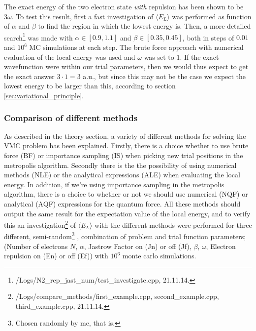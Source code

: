 The exact energy of the two electron state \textit{with} repulsion has been shown \cite{Taut} to be $3 \omega$. 
To test this result, first a fast investigation of $\langle E_L\rangle$ was performed as function of $\alpha$ and $\beta$ to find the region in which the lowest energy is. 
Then, a more detailed search\footnote{/Logs/N2\_rep\_jast\_num/test\_investigate.cpp, 21.11.14.} was made with $\alpha \in [0.9,1.1]$ and $\beta \in [0.35,0.45]$, both in steps of $0.01$ and $10^6$ MC simulations at each step. 
The brute force approach with numerical evaluation of the local energy was used and $\omega$ was set to $1$.
If the exact wavefunction were within our trial parameters, then we would thus expect to get the exact answer $3 \cdot 1 = 3$ a.u., but since this may not be the case we expect the lowest energy to be larger than this, according to section \ref{sec:variational_principle}.

\subsubsection{Comparison of different methods} \label{sec:exp_methods_E}

As described in the theory section, a variety of different methods for solving the VMC problem has been explained. 
Firstly, there is a choice whether to use brute force (BF) or importance sampling (IS) when picking new trial positions in the metropolis algorithm.
Secondly there is the the possibility of using numerical methods (NLE) or the analytical expressions (ALE) when evaluating the local energy. 
In addition, if we're using importance sampling in the metropolis algorithm, there is a choice to whether or not we should 
use numerical (NQF) or analytical (AQF) expressions for the quantum force. 
All these methods should output the same result for the expectation value of the local energy, and to verify this an investigation\footnote{/Logs/compare\_methods/first\_example.cpp, second\_example.cpp, third\_example.cpp, 21.11.14.}
 of $\langle E_L \rangle$ with the different methods were performed for three different, semi-random\footnote{Chosen randomly by me, that is.}
, combination of problem and trial function parameters; (Number of electrons $N$, $\alpha$, Jastrow Factor on (Jn) or off (Jf), $\beta$, $\omega$, Electron repulsion on (En) or off (Ef)) with $10^6$ monte carlo simulations.






















